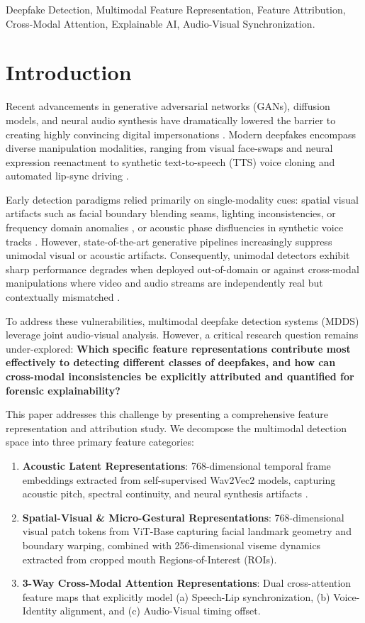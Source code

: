 \documentclass[conference]{IEEEtran}
\begin{document}
\begin{IEEEkeywords}
Deepfake Detection, Multimodal Feature Representation, Feature Attribution, Cross-Modal Attention, Explainable AI, Audio-Visual Synchronization.
\end{IEEEkeywords}

\section{Introduction}
Recent advancements in generative adversarial networks (GANs), diffusion models, and neural audio synthesis have dramatically lowered the barrier to creating highly convincing digital impersonations \cite{kharel2023dftransfusion, cao2026leveraging}. Modern deepfakes encompass diverse manipulation modalities, ranging from visual face-swaps and neural expression reenactment to synthetic text-to-speech (TTS) voice cloning and automated lip-sync driving \cite{khalid2021fakeavceleb, cai2022lavdf}. 

Early detection paradigms relied primarily on single-modality cues: spatial visual artifacts such as facial boundary blending seams, lighting inconsistencies, or frequency domain anomalies \cite{rossler2019faceforensics}, or acoustic phase disfluencies in synthetic voice tracks \cite{shi2026audio}. However, state-of-the-art generative pipelines increasingly suppress unimodal visual or acoustic artifacts. Consequently, unimodal detectors exhibit sharp performance degrades when deployed out-of-domain or against cross-modal manipulations where video and audio streams are independently real but contextually mismatched \cite{cozzolino2023audiovisual, wang2024vfd}.

To address these vulnerabilities, multimodal deepfake detection systems (MDDS) leverage joint audio-visual analysis. However, a critical research question remains under-explored: \textbf{Which specific feature representations contribute most effectively to detecting different classes of deepfakes, and how can cross-modal inconsistencies be explicitly attributed and quantified for forensic explainability?}

This paper addresses this challenge by presenting a comprehensive feature representation and attribution study. We decompose the multimodal detection space into three primary feature categories:
\begin{enumerate}
    \item \textbf{Acoustic Latent Representations}: 768-dimensional temporal frame embeddings extracted from self-supervised Wav2Vec2 models, capturing acoustic pitch, spectral continuity, and neural synthesis artifacts \cite{shi2026audio}.
    \item \textbf{Spatial-Visual \& Micro-Gestural Representations}: 768-dimensional visual patch tokens from ViT-Base capturing facial landmark geometry and boundary warping, combined with 256-dimensional viseme dynamics extracted from cropped mouth Regions-of-Interest (ROIs).
    \item \textbf{3-Way Cross-Modal Attention Representations}: Dual cross-attention feature maps that explicitly model (a) Speech-Lip synchronization, (b) Voice-Identity alignment, and (c) Audio-Visual timing offset.
\end{enumerate}
\end{document}
